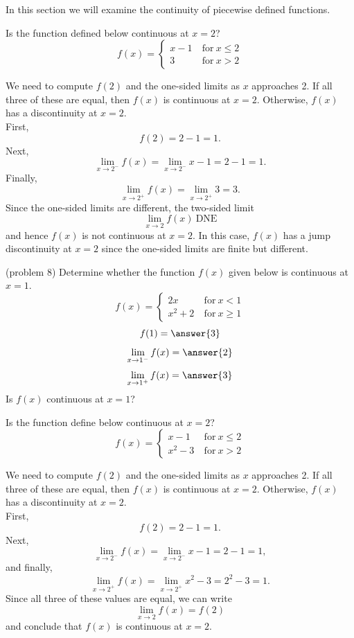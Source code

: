 \documentclass[handout]{ximera}
\begin{document}
In this section we will examine the continuity of piecewise defined functions.

\begin{example}[example 8]
Is the function defined below continuous at $x = 2$?
\[
f(x) = \left\{
     \begin{array}{lr}
       x-1 & \ \text{for} \  x \leq 2 \\
       3 & \ \text{for} \ x > 2
     \end{array}
   \right.
\]


We need to  compute $f(2)$ and the one-sided limits as $x$ approaches 2.
If all three of these are equal, then $f(x)$ is continuous at $x=2$.
Otherwise, $f(x)$ has a discontinuity at $x=2$.\\
First, 
\[
f(2) = 2-1 = 1.
\]
Next,  
\[\lim_{x \to 2^-} f(x) = \lim_{x \to 2^-} x-1 = 2-1 = 1.\]
Finally,
\[\lim_{x \to 2^+} f(x) = \lim_{x \to 2^+}3 = 3.\]
Since the one-sided limits are different, the two-sided limit
\[
\lim_{x \to 2} f(x) \ \text{DNE}
\]
and hence $f(x)$ is not continuous at $x = 2$.
In this case, $f(x)$ has a jump discontinuity at $x=2$ since the one-sided limits are finite but different.
\end{example}

\begin{problem}(problem 8)
Determine whether the function $f(x)$ given below is continuous at $x = 1$.
\[
f(x) = \left\{
     \begin{array}{lr}
       2x & \ \text{for} \  x < 1 \\
       x^2 + 2 & \ \text{for} \ x \geq 1
     \end{array}
   \right.
\]
\[
f(1) = \answer{3}
\]
\[
\lim_{x \to 1^-} f(x) = \answer{2}
\]
\[
\lim_{x \to 1^+} f(x) = \answer{3}
\]
Is $f(x)$ continuous at $x = 1$?
\begin{multipleChoice}
\end{multipleChoice}
\end{problem}





\begin{example}[example 9]
Is the function define below continuous at $x = 2$?
\[f(x) = \left\{
     \begin{array}{lr}
       x-1 & \ \text{for} \  x \leq 2 \\
       x^2 - 3 & \ \text{for} \ x > 2
     \end{array}
   \right.
\]

We need to  compute $f(2)$ and the one-sided limits as $x$ approaches 2.
If all three of these are equal, then $f(x)$ is continuous at $x=2$.
Otherwise, $f(x)$ has a discontinuity at $x=2$.\\
First, 
\[
f(2) = 2-1 = 1.
\]
Next, 
\[
\lim_{x \to 2^-} f(x) = \lim_{x \to 2^-} x-1 = 2-1 = 1,
\]
and finally,
\[
\lim_{x \to 2^+} f(x) = \lim_{x \to 2^+} x^2 - 3 = 2^2 - 3 = 1.
\]
Since all three of these values are equal, we can write
\[
\lim_{x \to 2} f(x) = f(2)
\]
and conclude that $f(x)$ is continuous at $x = 2$.
\end{example}
\end{document}
